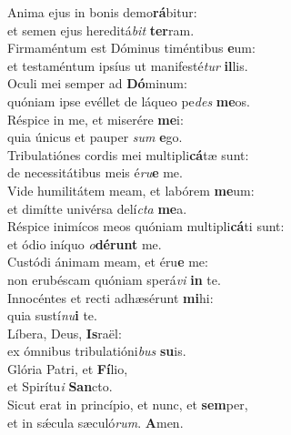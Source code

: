 \evenverse Anima ejus in bonis demo\textbf{rá}bitur:~\*\\
\evenverse et semen ejus hereditá\textit{bit} \textbf{ter}ram.\\
\oddverse Firmaméntum est Dóminus timéntibus \textbf{e}um:~\*\\
\oddverse et testaméntum ipsíus ut manifesté\textit{tur} \textbf{il}lis.\\
\evenverse Oculi mei semper ad \textbf{Dó}minum:~\*\\
\evenverse quóniam ipse evéllet de láqueo pe\textit{des} \textbf{me}os.\\
\oddverse Réspice in me, et miserére \textbf{me}i:~\*\\
\oddverse quia únicus et pauper \textit{sum} \textbf{e}go.\\
\evenverse Tribulatiónes cordis mei multipli\textbf{cá}tæ sunt:~\*\\
\evenverse de necessitátibus meis é\textit{ru}\textbf{e} me.\\
\oddverse Vide humilitátem meam, et labórem \textbf{me}um:~\*\\
\oddverse et dimítte univérsa delí\textit{cta} \textbf{me}a.\\
\evenverse Réspice inimícos meos quóniam multipli\textbf{cá}ti sunt:~\*\\
\evenverse et ódio iníquo \textit{o}\textbf{dé}\textbf{runt} me.\\
\oddverse Custódi ánimam meam, et éru\textbf{e} me:~\*\\
\oddverse non erubéscam quóniam sperá\textit{vi} \textbf{in} te.\\
\evenverse Innocéntes et recti adhæsérunt \textbf{mi}hi:~\*\\
\evenverse quia sustí\textit{nu}\textbf{i} te.\\
\oddverse Líbera, Deus, \textbf{Is}raël:~\*\\
\oddverse ex ómnibus tribulatióni\textit{bus} \textbf{su}is.\\
\evenverse Glória Patri, et \textbf{Fí}lio,~\*\\
\evenverse et Spirítu\textit{i} \textbf{San}cto.\\
\oddverse Sicut erat in princípio, et nunc, et \textbf{sem}per,~\*\\
\oddverse et in sǽcula sæculó\textit{rum}. \textbf{A}men.\\

